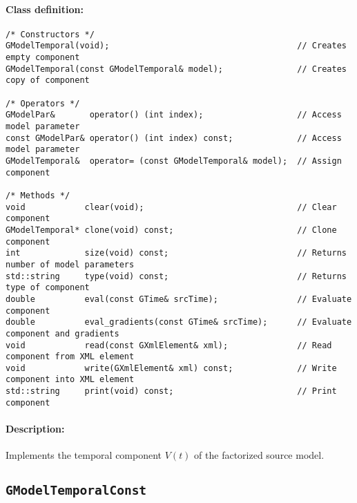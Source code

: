 \documentclass{article}[12pt,a4]
\begin{document}
\paragraph{Class definition:}
\begin{verbatim}
/* Constructors */
GModelTemporal(void);                                      // Creates empty component
GModelTemporal(const GModelTemporal& model);               // Creates copy of component

/* Operators */
GModelPar&       operator() (int index);                   // Access model parameter
const GModelPar& operator() (int index) const;             // Access model parameter
GModelTemporal&  operator= (const GModelTemporal& model);  // Assign component

/* Methods */
void            clear(void);                               // Clear component
GModelTemporal* clone(void) const;                         // Clone component
int             size(void) const;                          // Returns number of model parameters
std::string     type(void) const;                          // Returns type of component
double          eval(const GTime& srcTime);                // Evaluate component
double          eval_gradients(const GTime& srcTime);      // Evaluate component and gradients
void            read(const GXmlElement& xml);              // Read component from XML element
void            write(GXmlElement& xml) const;             // Write component into XML element
std::string     print(void) const;                         // Print component
\end{verbatim}

\paragraph{Description:}
Implements the temporal component $V(t)$ of the factorized source model.


\newpage
\subsection{{\tt GModelTemporalConst}}
\end{document}
